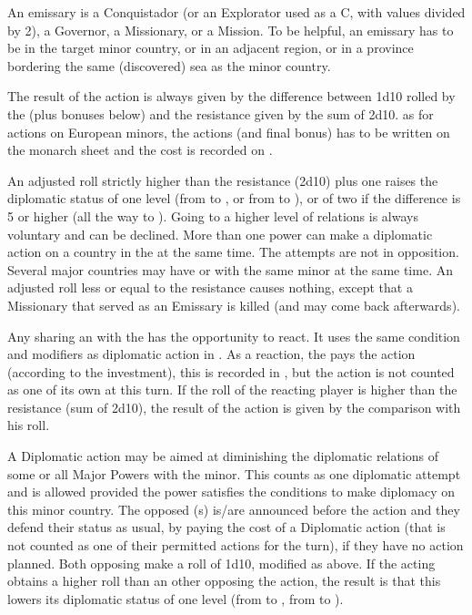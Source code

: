 \aparag[Emissaries]
An emissary is a Conquistador (or an Explorator used as a C, with values
divided by 2), a Governor, a Missionary, or a Mission. To be helpful, an
emissary has to be in the target minor country, or in an adjacent
region, or in a province bordering the same (discovered) sea as the
minor country.

The result of the action is always given by the difference between 1d10
rolled by the \MAJ (plus bonuses below) and the resistance given by the
sum of 2d10.
\bparag as for actions on European minors, the actions (and final bonus)
has to be written on the monarch sheet and the cost is recorded on
.
\diplorotw

\bparag An adjusted roll strictly higher than the resistance (2d10) plus
one raises the diplomatic status of one level (from \dipNR to \dipFR, or
from \dipFR to \dipAT), or of two if the difference is 5 or higher (all
the way to \dipAT).
\bparag Going to a higher level of relations is always voluntary and can
be declined.
\bparag More than one power can make a diplomatic action on a country in
the \ROTW at the same time. The attempts are not in opposition. Several
major countries may have \dipFR or \dipAT with the same minor at the
same time.
\bparag An adjusted roll less or equal to the resistance causes nothing,
except that a Missionary that served as an Emissary is killed (and may
come back afterwards).

\aparag[Reaction]
Any \MAJ sharing an \dipAT with the \MIN has the opportunity to react.
It uses the same condition and modifiers as diplomatic action in \ROTW.
As a reaction, the \MAJ pays the action (according to the investment),
this is recorded in , but the action
is not counted as one of its own at this turn. If the roll of the
reacting player is higher than the resistance (sum of 2d10), the result
of the action is given by the comparison with his roll.

A Diplomatic action may be aimed at diminishing the diplomatic relations
of some or all Major Powers with the minor. This counts as one
diplomatic attempt and is allowed provided the power satisfies the
conditions to make diplomacy on this minor country.  The opposed \MAJ(s)
is/are announced before the action and they defend their status as
usual, by paying the cost of a Diplomatic action (that is not counted as
one of their permitted actions for the turn), if they have no action
planned.
\bparag Both opposing \MAJ make a roll of 1d10, modified as above.  If
the acting \MAJ obtains a higher roll than an other \MAJ opposing the
action, the result is that this \MAJ lowers its diplomatic status of one
level (from \dipAT to \dipFR, from \dipFR to \dipNR).

